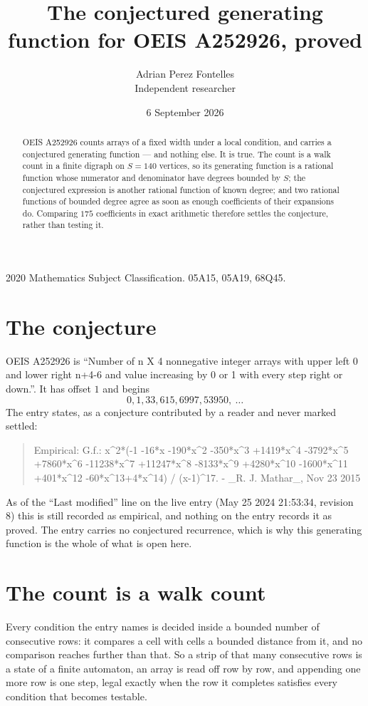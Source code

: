 \documentclass[11pt,a4paper]{article}
\title{The conjectured generating function for OEIS A252926, proved}
\author{Adrian Perez Fontelles\\ \small Independent researcher}
\date{6 September 2026}
\theoremstyle{plain}
\theoremstyle{definition}
\begin{document}
\maketitle

\begin{abstract}
OEIS A252926 counts arrays of a fixed width under a local condition, and carries a conjectured
generating function --- and nothing else. It is true. The count is a walk count in a finite
digraph on $S=140$ vertices, so its generating function is a rational function whose numerator
and denominator have degrees bounded by $S$; the conjectured expression is another rational
function of known degree; and two rational functions of bounded degree agree as soon as enough
coefficients of their expansions do. Comparing $175$ coefficients in exact arithmetic
therefore settles the conjecture, rather than testing it.
\end{abstract}

\noindent\small 2020 Mathematics Subject Classification. 05A15, 05A19, 68Q45.\normalsize

\section{The conjecture}

OEIS A252926 is ``Number of n X 4 nonnegative integer arrays with upper left 0 and lower right n+4-6 and value increasing by 0 or 1 with every step right or down.''. It has offset $1$ and begins
\[
0, 1, 33, 615, 6997, 53950,\ \dots
\]
The entry states, as a conjecture contributed by a reader and never marked settled:
\begin{quote}
Empirical: G.f.: x\^{}2*(-1 -16*x -190*x\^{}2 -350*x\^{}3 +1419*x\^{}4 -3792*x\^{}5 +7860*x\^{}6 -11238*x\^{}7 +11247*x\^{}8 -8133*x\^{}9 +4280*x\^{}10 -1600*x\^{}11 +401*x\^{}12 -60*x\^{}13+4*x\^{}14) / (x-1)\^{}17. - \_R. J. Mathar\_, Nov 23 2015
\end{quote}
As of the ``Last modified'' line on the live entry (May 25 2024 21:53:34, revision 8) this is still
recorded as empirical, and nothing on the entry records it as proved. The entry carries no
conjectured recurrence, which is why this generating function is the whole of what is open
here.

\section{The count is a walk count}

Every condition the entry names is decided inside a bounded number of consecutive rows: it
compares a cell with cells a bounded distance from it, and no comparison reaches further than
that. So a strip of that many consecutive rows is a state of a finite automaton, an array is
read off row by row, and appending one more row is one step, legal exactly when the row it
completes satisfies every condition that becomes testable.
\end{document}
